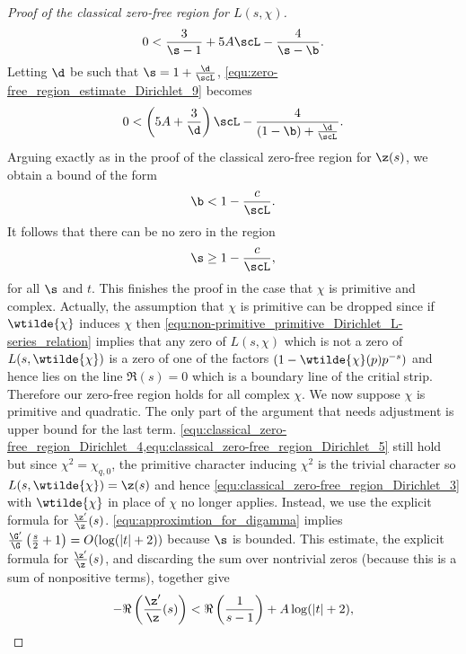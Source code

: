 \begin{proof}[Proof of the classical zero-free region for $L(s,\chi)$]
\begin{equation}
          0 < \frac{3}{\s-1}+5A\scL-\frac{4}{\s-\b}.
        \end{equation}
        Letting $\d$ be such that $\s = 1+\frac{\d}{\scL}$, \cref{equ:zero-free_region_estimate_Dirichlet_9} becomes
        \[
          0 < \left(5A+\frac{3}{\d}\right)\scL-\frac{4}{(1-\b)+\frac{\d}{\scL}}.
        \]
        Arguing exactly as in the proof of the classical zero-free region for $\z(s)$, we obtain a bound of the form
        \begin{equation}\label{equ:zero-free_region_estimate_Dirichlet_beta_bound}
          \b < 1-\frac{c}{\scL}.
        \end{equation}
        It follows that there can be no zero in the region
        \begin{equation}\label{equ:zero-free_region_estimate_Dirichlet_sigma_bound}
          \s \ge 1-\frac{c}{\scL},
        \end{equation}
        for all $\s$ and $t$. This finishes the proof in the case that $\chi$ is primitive and complex. Actually, the assumption that $\chi$ is primitive can be dropped since if $\wtilde{\chi}$ induces $\chi$ then \cref{equ:non-primitive_primitive_Dirichlet_L-series_relation} implies that any zero of $L(s,\chi)$ which is not a zero of $L(s,\wtilde{\chi})$ is a zero of one of the factors $(1-\wtilde{\chi}(p)p^{-s})$ and hence lies on the line $\Re(s) = 0$ which is a boundary line of the critial strip. Therefore our zero-free region holds for all complex $\chi$. We now suppose $\chi$ is primitive and quadratic. The only part of the argument that needs adjustment is upper bound for the last term. \cref{equ:classical_zero-free_region_Dirichlet_4,equ:classical_zero-free_region_Dirichlet_5} still hold but since $\chi^{2} = \chi_{q,0}$, the primitive character inducing $\chi^{2}$ is the trivial character so $L(s,\wtilde{\chi}) = \z(s)$ and hence \cref{equ:classical_zero-free_region_Dirichlet_3} with $\wtilde{\chi}$ in place of $\chi$ no longer applies. Instead, we use the explicit formula for $\frac{\z'}{\z}(s)$. \cref{equ:approximtion_for_digamma} implies $\frac{\G'}{\G}\left(\frac{s}{2}+1\right) = O(\log(|t|+2))$ because $\s$ is bounded. This estimate, the explicit formula for $\frac{\z'}{\z}(s)$, and discarding the sum over nontrivial zeros (because this is a sum of nonpositive terms), together give
        \begin{equation}\label{equ:classical_zero-free_region_Dirichlet_10}
          -\Re\left(\frac{\z'}{\z}(s)\right) < \Re\left(\frac{1}{s-1}\right)+A\log(|t|+2),
        \end{equation}

\end{proof}
